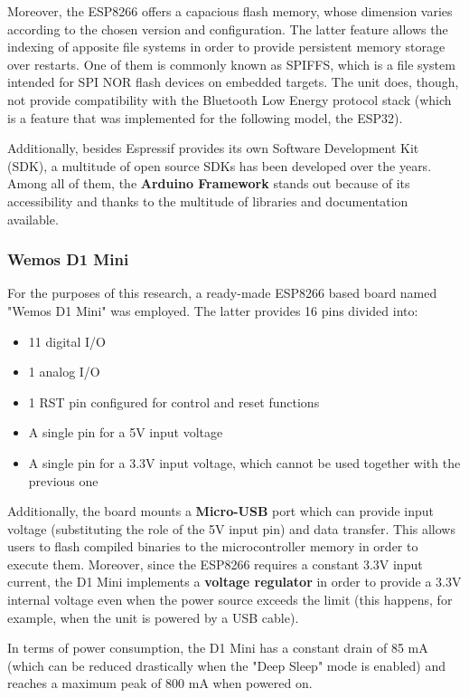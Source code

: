 Moreover, the ESP8266 offers a capacious flash memory, whose dimension varies according to the chosen version and configuration. The latter feature allows the indexing of apposite file systems in order to provide persistent memory storage over restarts. One of them is commonly known as SPIFFS, which is a file system intended for SPI NOR flash devices on embedded targets. The unit does, though, not provide compatibility with the Bluetooth Low Energy protocol stack (which is a feature that was implemented for the following model, the ESP32).

Additionally, besides Espressif provides its own Software Development Kit (SDK), a multitude of open source SDKs has been developed over the years. Among all of them, the \textbf{Arduino Framework} stands out because of its accessibility and thanks to the multitude of libraries and documentation available. 

\subsubsection{Wemos D1 Mini}\label{subsubsec:d1mini}

For the purposes of this research, a ready-made ESP8266 based board named "Wemos D1 Mini" was employed. The latter provides 16 pins divided into:

\begin{itemize}
    \item 11 digital I/O
    \item 1 analog I/O
    \item 1 RST pin configured for control and reset functions
    \item A single pin for a 5V input voltage
    \item A single pin for a 3.3V input voltage, which cannot be used together with the previous one
\end{itemize}

Additionally, the board mounts a \textbf{Micro-USB} port which can provide input voltage (substituting the role of the 5V input pin) and data transfer. This allows users to flash compiled binaries to the microcontroller memory in order to execute them. Moreover, since the ESP8266 requires a constant 3.3V input current, the D1 Mini implements a \textbf{voltage regulator} in order to provide a 3.3V internal voltage even when the power source exceeds the limit (this happens, for example, when the unit is powered by a USB cable).

In terms of power consumption, the D1 Mini has a constant drain of 85 mA (which can be reduced drastically when the "Deep Sleep" mode is enabled) and reaches a maximum peak of 800 mA when powered on.

